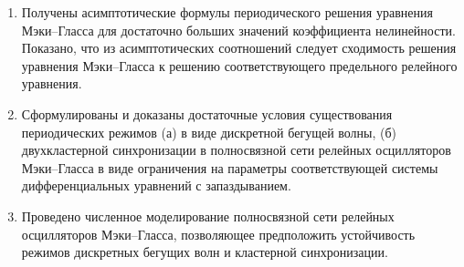 
\begin{enumerate}
  \item Получены асимптотические формулы периодического решения уравнения Мэки--Гласса для достаточно больших значений коэффициента нелинейности. Показано, что из асимптотических соотношений следует сходимость решения уравнения Мэки--Гласса к решению соответствующего предельного релейного уравнения.
  \item Сформулированы и доказаны достаточные условия существования периодических режимов (а) в виде дискретной бегущей волны, (б) двухкластерной синхронизации в полносвязной сети релейных осцилляторов Мэки--Гласса в виде ограничения на параметры соответствующей системы дифференциальных уравнений с запаздыванием. 
  \item Проведено численное моделирование полносвязной сети релейных осцилляторов Мэки--Гласса, позволяющее предположить устойчивость режимов дискретных бегущих волн и кластерной синхронизации.
\end{enumerate}
